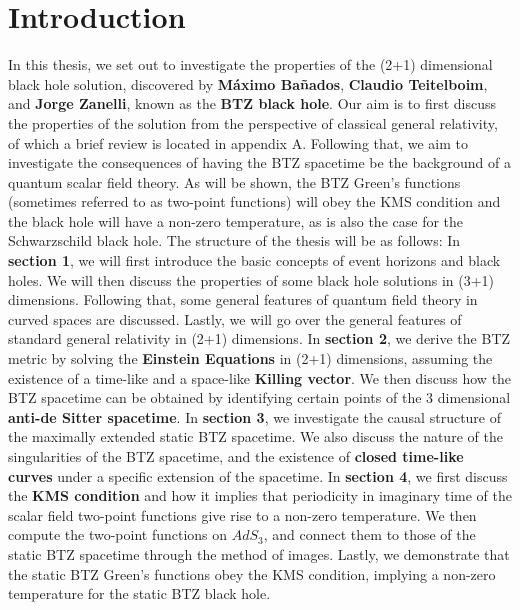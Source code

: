 %
\section{Introduction}
In this thesis, we set out to investigate the properties of the (2+1) dimensional black hole solution, discovered by \textbf{Máximo Bañados}, \textbf{Claudio Teitelboim}, and \textbf{Jorge Zanelli}, known as the \textbf{BTZ black hole}. Our aim is to first discuss the properties of the solution from the perspective of classical general relativity, of which a brief review is located in appendix A. Following that, we aim to investigate the consequences of having the BTZ spacetime be the background of a quantum scalar field theory. As will be shown, the BTZ Green's functions (sometimes referred to as two-point functions) will obey the KMS condition and the black hole will have a non-zero temperature, as is also the case for the Schwarzschild black hole. The structure of the thesis will be as follows:\newline
In \textbf{section 1}, we will first introduce the basic concepts of event horizons and black holes. We will then discuss the properties of some black hole solutions in (3+1) dimensions. Following that, some general features of quantum field theory in curved spaces are discussed. Lastly, we will go over the general features of standard general relativity in (2+1) dimensions.\newline
In \textbf{section 2}, we derive the BTZ metric by solving the \textbf{Einstein Equations} in (2+1) dimensions, assuming the existence of a time-like and a space-like \textbf{Killing vector}. We then discuss how the BTZ spacetime can be obtained by identifying certain points of the 3 dimensional \textbf{anti-de Sitter spacetime}.\newline
In \textbf{section 3}, we investigate the causal structure of the maximally extended static BTZ spacetime. We also discuss the nature of the singularities of the BTZ spacetime, and the existence of \textbf{closed time-like curves} under a specific extension of the spacetime.\newline
In \textbf{section 4}, we first discuss the \textbf{KMS condition} and how it implies that periodicity in imaginary time of the scalar field two-point functions give rise to a non-zero temperature. We then compute the two-point functions on $AdS_3$, and connect them to those of the static BTZ spacetime through the method of images. Lastly, we demonstrate that the static BTZ Green's functions obey the KMS condition, implying a non-zero temperature for the static BTZ black hole.
%
%
%

